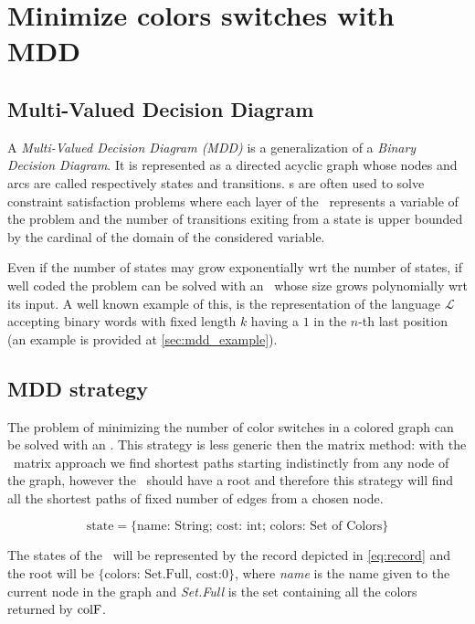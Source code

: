 \section{Minimize colors switches with MDD}

\subsection{Multi-Valued Decision Diagram}

A \textit{Multi-Valued Decision Diagram (MDD)}\cite{regin} is a generalization of a \textit{Binary Decision Diagram}. It is represented as a directed acyclic graph whose nodes and arcs are called respectively states and transitions. \mdd s are often used to solve constraint satisfaction problems where each layer of the \mdd\ represents a variable of the problem and the number of transitions exiting from a state is upper bounded by the cardinal of the domain of the considered variable.

Even if the number of states may grow exponentially wrt the number of states, if well coded the problem can be solved with an \mdd\ whose size grows polynomially wrt its input. A well known example of this, is the representation of the language $\mathcal{L}$ accepting binary words with fixed length $k$ having a $1$ in the $n$-th last position (an example is provided at \cref{sec:mdd_example}).

\subsection{MDD strategy}
\label{sec:algo_mdd}
The problem of minimizing the number of color switches in a colored graph can be solved with an \mdd. This strategy is less generic then the matrix method: with the \FW\ matrix approach we find shortest paths starting indistinctly from any node of the graph, however the \mdd\ should have a root and therefore this strategy will find all the shortest paths of fixed number of edges from a chosen node.

\begin{equation}
  \label{eq:record}
  \text{state} = \{\text{name: String; cost: int; colors: Set of Colors}\}
\end{equation}

The states of the \mdd\ will be represented by the record depicted in \cref{eq:record} and the root will be $\{\text{colors: Set.Full, cost:} 0\}$, where \textit{name} is the name given to the current node in the graph and \textit{Set.Full} is the set containing all the colors returned by $\text{colF}$.


